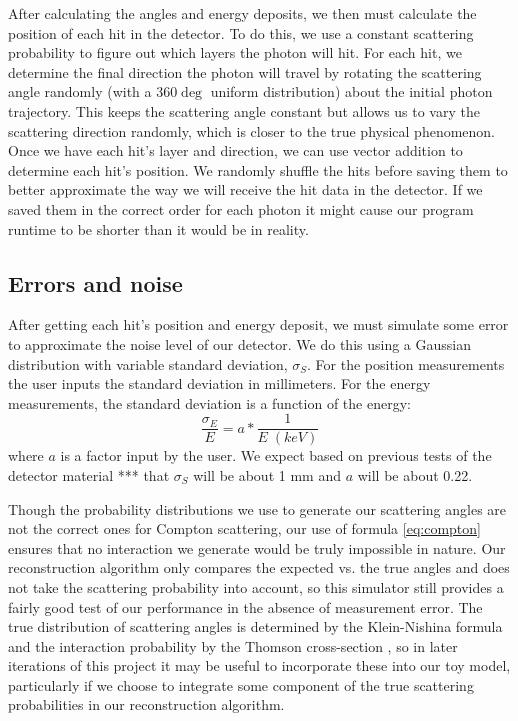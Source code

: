 After calculating the angles and energy deposits, we then must calculate the position of each hit in the detector. To do this, we use a constant scattering probability to figure out which layers the photon will hit. For each hit, we determine the final direction the photon will travel by rotating the scattering angle randomly (with a 360$\deg$ uniform distribution) about the initial photon trajectory. This keeps the scattering angle constant but allows us to vary the scattering direction randomly, which is closer to the true physical phenomenon. Once we have each hit's layer and direction, we can use vector addition to determine each hit's position. We randomly shuffle the hits before saving them to better approximate the way we will receive the hit data in the detector. If we saved them in the correct order for each photon it might cause our program runtime to be shorter than it would be in reality.

\subsection{Errors and noise}
After getting each hit's position and energy deposit, we must simulate some error to approximate the noise level of our detector. We do this using a Gaussian distribution with variable standard deviation, $\sigma_S$. For the position measurements the user inputs the standard deviation in millimeters. For the energy measurements, the standard deviation is a function of the energy:
\begin{equation}\label{eq:sigE}
\frac{\sigma_E}{E} = a*\frac{1}{E \; (keV)}
\end{equation}
where $a$ is a factor input by the user. We expect based on previous tests of the detector material \cite{}*** that $\sigma_S$ will be about 1 mm and $a$ will be about 0.22.

Though the probability distributions we use to generate our scattering angles are not the correct ones for Compton scattering, our use of formula \ref{eq:compton} ensures that no interaction we generate would be truly impossible in nature. Our reconstruction algorithm only compares the expected vs. the true angles and does not take the scattering probability into account, so this simulator still provides a fairly good test of our performance in the absence of measurement error. The true distribution of scattering angles is determined by the Klein-Nishina formula and the interaction probability by the Thomson cross-section \cite{klein-nishina}, so in later iterations of this project it may be useful to incorporate these into our toy model, particularly if we choose to integrate some component of the true scattering probabilities in our reconstruction algorithm.

